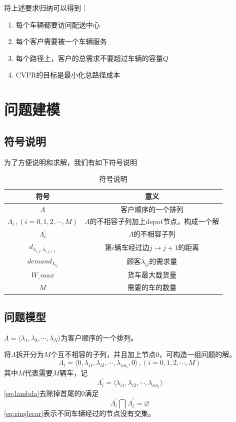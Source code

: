 \documentclass{nudt}
\begin{document}
将上述要求归纳可以得到：
\begin{enumerate}
	\item 每个车辆都要访问配送中心
	\item 每个客户需要被一个车辆服务
	\item 每个路径上，客户的总需求不要超过车辆的容量$Q$ 
	\item CVPR的目标是最小化总路径成本
\end{enumerate}

\section{问题建模}
\subsection{符号说明}
为了方便说明和求解，我们有如下符号说明
\begin{table}[htbp]
	\centering
	\caption{符号说明}
	  \begin{tabular}{cc}
	  \toprule
	  符号  & 意义 \\
	  \midrule
	  $\Lambda$ & 客户顺序的一个排列 \\
	  $\Lambda_{i}\, ,(i=0,1,2,\cdots ,M)$ & $\Lambda$的不相容子列加上depot节点，构成一个解 \\
	  $\Lambda_{i}^{'}$ & $\Lambda$的不相容子列 \\
	  $d_{\lambda_{i,j},\lambda_{i,j+1}}$ & 第$i$辆车经过边$j\rightarrow j+1$的距离 \\
	  $demand_{\lambda_{ij}}$ & 顾客$\lambda_{ij}$的需求量 \\
	  $W\_max$ & 货车最大载货量 \\
	  $M$ & 需要的车的数量 \\
	  \bottomrule
	  \end{tabular}%
	\label{tab:notations}%
  \end{table}%
  
\subsection{问题模型}
\begin{definition}\label{def:xulie}
	$\Lambda = \langle \lambda_1,\lambda_2,\cdots, \lambda_N \rangle $为客户顺序的一个排列。\cite{wuyanqun}
\end{definition}
将$\Lambda$拆开分为$M$个互不相容的子列，并且加上节点$0$，可构造一组问题的解。
\begin{equation}\label{eq:lambda}
	\Lambda_i = \langle 0, \lambda_{i1},\lambda_{i2},\cdots, \lambda_{im_i},0 \rangle
	\, ,(i=0,1,2,\cdots ,M)
\end{equation}
其中$M$代表需要$M$辆车，记
\[
\Lambda_i^{'}=\langle \lambda_{i1},\lambda_{i2},\cdots, \lambda_{im_i} \rangle
\]
\cref{eq:lambda}去除掉首尾的$0$满足
\begin{equation}\label{eq:singlecar}
	\Lambda_i^{'} \bigcap \Lambda_j^{'} = \varnothing
\end{equation}
\cref{eq:singlecar}表示不同车辆经过的节点没有交集。
\end{document}
